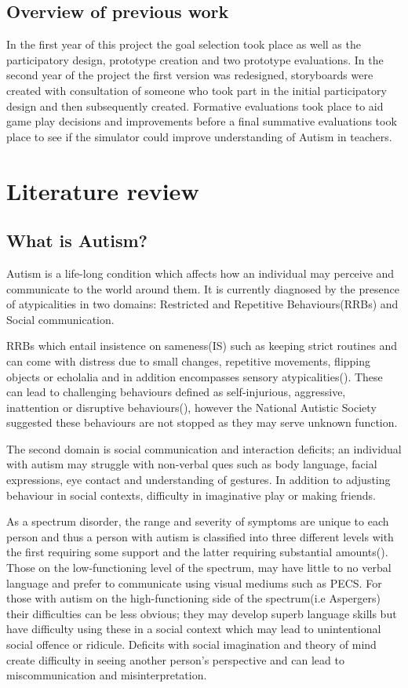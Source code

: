 \documentclass[11pt]{report}
\begin{document}
\section{Overview of previous work}
In the first year of this project the goal selection took place as well as the participatory design, prototype creation and two prototype evaluations. In the second year of the project the first version was redesigned, storyboards were created with consultation of someone who took part in the initial participatory design and then subsequently created. Formative evaluations took place to aid game play decisions and improvements before a final summative evaluations took place to see if the simulator could improve understanding of Autism in teachers. 

\chapter{Literature review}

\section{What is Autism?}

Autism is a life-long condition which affects how an individual may perceive and communicate to the world around them\cite{nas}. It is currently diagnosed by the presence of atypicalities in two domains: Restricted and Repetitive Behaviours(RRBs) and Social communication.

RRBs which entail insistence on sameness(IS) such as keeping strict routines and can come with distress due to small changes, repetitive movements, flipping objects or echolalia and in addition encompasses sensory atypicalities(\cite{dsm52}). These can lead to challenging behaviours defined as self-injurious, aggressive, inattention or disruptive behaviours(\cite{teacherchallenge}), however the National Autistic Society suggested these behaviours are not stopped as they may serve unknown function.
 
The second domain is social communication and interaction deficits; an individual with autism may struggle with non-verbal ques such as body language, facial expressions, eye contact and understanding of gestures. In addition to adjusting behaviour in social contexts, difficulty in imaginative play or making friends.  

As a spectrum disorder, the range and severity of symptoms are unique to each person and thus a person with autism is classified into three different levels with the first requiring some support and the latter requiring substantial amounts(\cite{dsm52}). Those on the low-functioning level of the spectrum, may have little to no verbal language and prefer to communicate using visual mediums such as PECS. For those with autism on the high-functioning side of the spectrum(i.e Aspergers) their difficulties can be less obvious; they may develop superb language skills but have difficulty using these in a social context which may lead to unintentional social offence or ridicule. Deficits with social imagination and theory of mind create difficulty in seeing another person's perspective and can lead to miscommunication and misinterpretation. 
\end{document}
